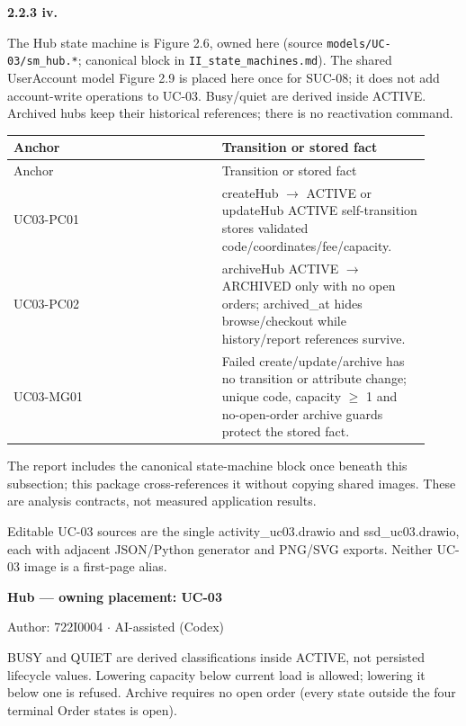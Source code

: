 \textbf{2.2.3 iv.}\par
The Hub state machine is Figure 2.6, owned here (source \texttt{models/\allowbreak{}UC-03/\allowbreak{}sm\_\allowbreak{}hub.\allowbreak{}*}; canonical block in \texttt{II\_\allowbreak{}state\_\allowbreak{}machines.\allowbreak{}md}). The shared UserAccount model Figure 2.9 is placed here once for SUC-08; it does not add account-write operations to UC-03. Busy/quiet are derived inside ACTIVE. Archived hubs keep their historical references; there is no reactivation command.

\begin{longtable}{>{\raggedright\arraybackslash}p{0.4600\linewidth}>{\raggedright\arraybackslash}p{0.4600\linewidth}}
Anchor & Transition or stored fact \\
\hline\endfirsthead
Anchor & Transition or stored fact \\
\hline\endhead
UC03-PC01 & createHub \ensuremath{\rightarrow} ACTIVE or updateHub ACTIVE self-transition stores validated code/coordinates/fee/capacity. \\
UC03-PC02 & archiveHub ACTIVE \ensuremath{\rightarrow} ARCHIVED only with no open orders; archived\_at hides browse/checkout while history/report references survive. \\
UC03-MG01 & Failed create/update/archive has no transition or attribute change; unique code, capacity \ensuremath{\geq} 1 and no-open-order archive guards protect the stored fact. \\
\end{longtable}
The report includes the canonical state-machine block once beneath this subsection; this package cross-references it without copying shared images. These are analysis contracts, not measured application results.

Editable UC-03 sources are the single activity\_uc03.drawio and ssd\_uc03.drawio, each with adjacent JSON/Python generator and PNG/SVG exports. Neither UC-03 image is a first-page alias.

\textbf{Hub --- owning placement: UC-03}

Author: 722I0004 \ensuremath{\cdot} AI-assisted (Codex)

BUSY and QUIET are derived classifications inside ACTIVE, not persisted lifecycle values. Lowering capacity below current load is allowed; lowering it below one is refused. Archive requires no open order (every state outside the four terminal Order states is open).

